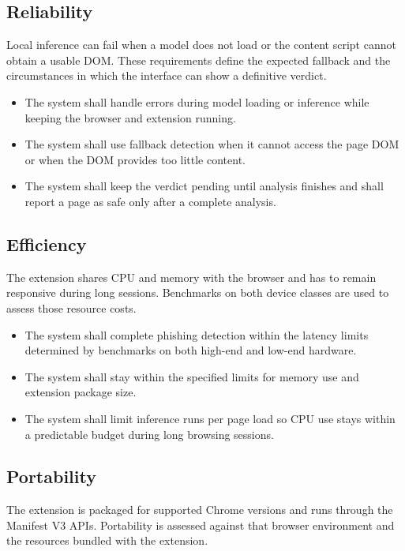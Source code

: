 \documentclass{FastFyp}
\begin{document}
\subsection{Reliability}
Local inference can fail when a model does not load or the content script cannot obtain a usable DOM. These requirements define the expected fallback and the circumstances in which the interface can show a definitive verdict.

\begin{itemize}
    \item The system shall handle errors during model loading or inference while keeping the browser and extension running.
    \item The system shall use fallback detection when it cannot access the page DOM or when the DOM provides too little content.
    \item The system shall keep the verdict pending until analysis finishes and shall report a page as safe only after a complete analysis.
\end{itemize}

\subsection{Efficiency}
The extension shares CPU and memory with the browser and has to remain responsive during long sessions. Benchmarks on both device classes are used to assess those resource costs.

\begin{itemize}
    \item The system shall complete phishing detection within the latency limits determined by benchmarks on both high-end and low-end hardware.
    \item The system shall stay within the specified limits for memory use and extension package size.
    \item The system shall limit inference runs per page load so CPU use stays within a predictable budget during long browsing sessions.
\end{itemize}

\subsection{Portability}
The extension is packaged for supported Chrome versions and runs through the Manifest V3 APIs. Portability is assessed against that browser environment and the resources bundled with the extension.
\end{document}
